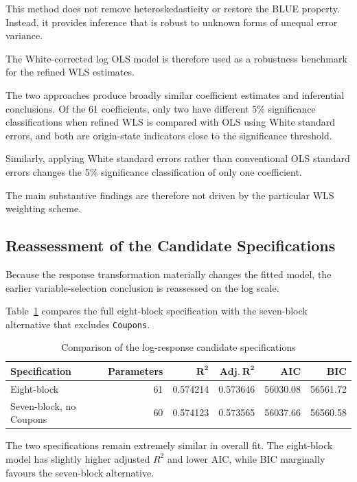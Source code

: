 \documentclass[11pt,a4paper]{article}
\begin{document}
This method does not remove heteroskedasticity or restore the BLUE property. Instead, it provides inference that is robust to unknown forms of unequal error variance.

The White-corrected log OLS model is therefore used as a robustness benchmark for the refined WLS estimates.

The two approaches produce broadly similar coefficient estimates and inferential conclusions. Of the 61 coefficients, only two have different 5\% significance classifications when refined WLS is compared with OLS using White standard errors, and both are origin-state indicators close to the significance threshold.

Similarly, applying White standard errors rather than conventional OLS standard errors changes the 5\% significance classification of only one coefficient.

The main substantive findings are therefore not driven by the particular WLS weighting scheme.

\subsection{Reassessment of the Candidate Specifications}

Because the response transformation materially changes the fitted model, the earlier variable-selection conclusion is reassessed on the log scale.

Table~\ref{tab:log-candidate-comparison} compares the full eight-block specification with the seven-block alternative that excludes \texttt{Coupons}.

\begin{table}[H]
\centering
\caption{Comparison of the log-response candidate specifications}
\label{tab:log-candidate-comparison}
\begin{tabular}{lrrrrr}
\toprule
\textbf{Specification} & \textbf{Parameters} & \(\mathbf{R^2}\) & \(\mathbf{Adj.\ R^2}\) & \textbf{AIC} & \textbf{BIC} \\
\midrule
Eight-block & 61 & 0.574214 & 0.573646 & 56030.08 & 56561.72 \\
Seven-block, no Coupons & 60 & 0.574123 & 0.573565 & 56037.66 & 56560.58 \\
\bottomrule
\end{tabular}
\end{table}

The two specifications remain extremely similar in overall fit. The eight-block model has slightly higher adjusted \(R^2\) and lower AIC, while BIC marginally favours the seven-block alternative.
\end{document}
